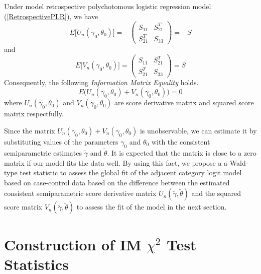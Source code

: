 \documentclass[11pt]{article}
\theoremstyle{plain}
\theoremstyle{definition}
\theoremstyle{remark}
\theoremstyle{definition}
\begin{document}
{\theorem Under model retrospective polychotomous logistic regression model (\ref{RetrospectivePLR}), we have
\begin{equation}
E\Big[U_n(\gamma_0,\theta_0) \Big]=- \left(\begin{array}{cc} S_{11}
& S_{21}^T \\ S_{21}^T & S_{33}
\end{array} \right)=- S
\end{equation}
and
\begin{equation}
E\Big[V_n(\gamma_0,\theta_0)\Big]= \left(\begin{array}{cc} S_{11} &
S_{21}^T \\ S_{21}^T & S_{33}
\end{array} \right)= S
\label{squarescore}
\end{equation}
Consequently, the following {\em Information Matrix Equality} holds.
\begin{equation}
E\big(U_n(\gamma_0,\theta_0)+V_n(\gamma_0,\theta_0) \big)=0
\end{equation}
where $U_n(\gamma_0,\theta_0)$ and $V_n(\gamma_0,\theta_0)$ are
score derivative matrix and squared score matrix respectfully. }

Since the matrix $U_n(\gamma_0,\theta_0)+V_n(\gamma_0,\theta_0)$ is
unobservable, we can estimate it by substituting values of the
parameters $\gamma_0$ and $\theta_0$ with the consistent
semiparametric estimates $\tilde{\gamma}$ and $\tilde{\theta}$. It
is expected that the matrix is close to a zero matrix if our model
fits the data well. By using this fact, we propose a a Wald-type
test statistic to assess the global fit of the adjacent category
logit model based on case-control data based on the difference
between the estimated consistent semiparametric score derivative
matrix $U_n(\tilde{\gamma},\tilde{\theta})$ and the squared score
matrix $V_n(\tilde{\gamma},\tilde{\theta})$ to assess the fit of
the model in the next section.


\section{Construction of IM $\chi^2$ Test Statistics} \label{sec4}
\end{document}
